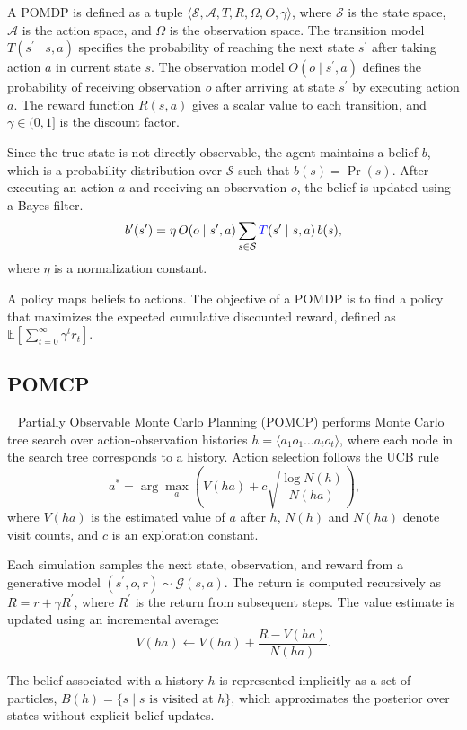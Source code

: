A POMDP is defined as a tuple $\langle \mathcal{S}, \mathcal{A}, T, R, \Omega, O, \gamma \rangle$, where $\mathcal{S}$ is the state space, $\mathcal{A}$ is the action space, and $\Omega$ is the observation space. The transition model $T(s^\prime \mid s, a)$ specifies the probability of reaching the next state $s^\prime$ after taking action $a$ in current state $s$. The observation model $O(o \mid s^\prime, a)$ defines the probability of receiving observation $o$ after arriving at state $s^\prime$ by executing action $a$. The reward function $R(s,a)$ gives a scalar value to each transition, and $\gamma \in (0,1]$ is the discount factor.

Since the true state is not directly observable, the agent maintains a belief $b$, which is a probability distribution over $\mathcal{S}$ such that $b(s) = \Pr(s)$. After executing an action $a$ and receiving an observation $o$, the belief is updated using a Bayes filter.
\[
b^\prime(s^\prime) = \eta \, O(o \mid s^\prime,a) \sum_{s \in \mathcal{S}} {\color{blue}{T}}(s^\prime \mid s,a) \, b(s),
\]
where $\eta$ is a normalization constant.

A policy \cp{$\mu$} maps beliefs to actions. The objective of a POMDP is to find a policy that maximizes the expected cumulative discounted reward, defined as $\mathbb{E}\left[\sum_{t=0}^{\infty} \gamma^t r_t \right]$.


\subsection{POMCP}~\label{preliminaries:POMCP}
Partially Observable Monte Carlo Planning (POMCP) performs Monte Carlo tree search over action-observation histories $h = \langle a_1 o_1 \dots a_t o_t \rangle$, where each node in the search tree corresponds to a history. Action selection follows the UCB rule
\begin{equation}~\label{eq:ucb}
a^* = \arg\max_a \left( V(ha) + c \sqrt{\frac{\log N(h)}{N(ha)}} \right),
\end{equation}
where $V(ha)$ is the estimated value of $a$ after $h$, $N(h)$ and $N(ha)$ denote visit counts, and $c$ is an exploration constant.

Each simulation samples the next state, observation, and reward from a generative model $(s^\prime, o, r) \sim \mathcal{G}(s,a)$. The return is computed recursively as $R = r + \gamma R^\prime$, where $R^\prime$ is the return from subsequent steps. The value estimate is updated using an incremental average:
\[
V(ha) \leftarrow V(ha) + \frac{R - V(ha)}{N(ha)}.
\]

The belief associated with a history $h$ is represented implicitly as a set of particles, $B(h) = \{ s \mid s \text{ is visited at } h \}$, which approximates the posterior over states without explicit belief updates.
